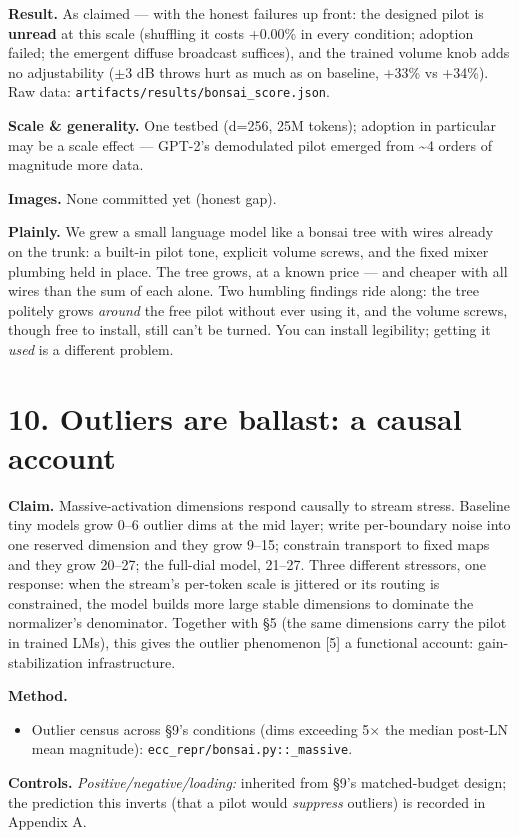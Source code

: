 \documentclass[10pt]{article}
\begin{document}
\textbf{Result.} As claimed --- with the honest failures up front: the designed pilot is \textbf{unread} at
this scale (shuffling it costs +0.00\% in every condition; adoption failed; the emergent diffuse
broadcast suffices), and the trained volume knob adds no adjustability ($\pm$3 dB throws hurt as much
as on baseline, +33\% vs +34\%). Raw data: \texttt{artifacts/results/bonsai\_score.json}.

\textbf{Scale \& generality.} One testbed (d=256, 25M tokens); adoption in particular may be a scale
effect --- GPT-2's demodulated pilot emerged from \textasciitilde{}4 orders of magnitude more data.

\textbf{Images.} None committed yet (honest gap).

\textbf{Plainly.} We grew a small language model like a bonsai tree with wires already on the trunk: a
built-in pilot tone, explicit volume screws, and the fixed mixer plumbing held in place. The tree
grows, at a known price --- and cheaper with all wires than the sum of each alone. Two humbling
findings ride along: the tree politely grows \emph{around} the free pilot without ever using it, and
the volume screws, though free to install, still can't be turned. You can install legibility;
getting it \emph{used} is a different problem.

\section{10. Outliers are ballast: a causal account}

\textbf{Claim.} Massive-activation dimensions respond causally to stream stress. Baseline tiny models
grow 0--6 outlier dims at the mid layer; write per-boundary noise into one reserved dimension and
they grow 9--15; constrain transport to fixed maps and they grow 20--27; the full-dial model, 21--27.
Three different stressors, one response: when the stream's per-token scale is jittered or its
routing is constrained, the model builds more large stable dimensions to dominate the normalizer's
denominator. Together with §5 (the same dimensions carry the pilot in trained LMs), this gives the
outlier phenomenon [5] a functional account: gain-stabilization infrastructure.

\textbf{Method.}
\begin{itemize}\setlength\itemsep{1pt}
\item Outlier census across §9's conditions (dims exceeding 5$\times$ the median post-LN mean magnitude): \texttt{ecc\_repr/bonsai.py::\_massive}.
\end{itemize}
\textbf{Controls.} \emph{Positive/negative/loading:} inherited from §9's matched-budget design; the
prediction this inverts (that a pilot would \emph{suppress} outliers) is recorded in Appendix A.
\end{document}
